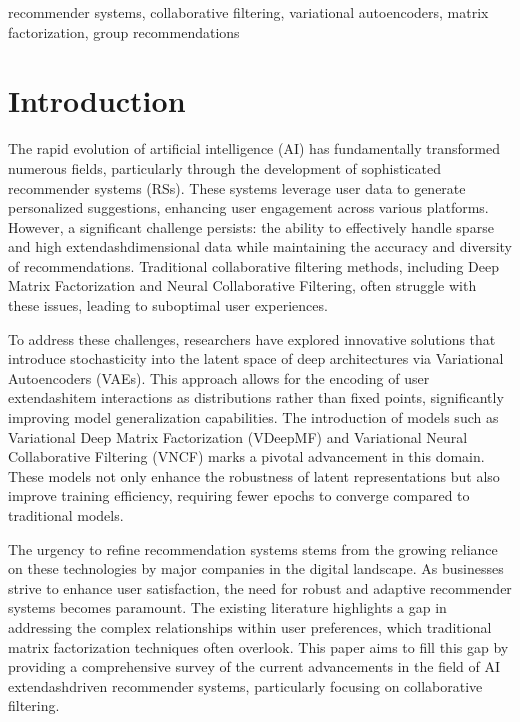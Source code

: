 \documentclass[runningheads]{llncs}
\begin{document}
\begin{keywords}
recommender systems, collaborative filtering, variational autoencoders, matrix factorization, group recommendations
\end{keywords}

\section{Introduction}
The rapid evolution of artificial intelligence (AI) has fundamentally transformed numerous fields, particularly through the development of sophisticated recommender systems (RSs). These systems leverage user data to generate personalized suggestions, enhancing user engagement across various platforms. However, a significant challenge persists: the ability to effectively handle sparse and high	extendash{}dimensional data while maintaining the accuracy and diversity of recommendations. Traditional collaborative filtering methods, including Deep Matrix Factorization and Neural Collaborative Filtering, often struggle with these issues, leading to suboptimal user experiences.

To address these challenges, researchers have explored innovative solutions that introduce stochasticity into the latent space of deep architectures via Variational Autoencoders (VAEs). This approach allows for the encoding of user	extendash{}item interactions as distributions rather than fixed points, significantly improving model generalization capabilities. The introduction of models such as Variational Deep Matrix Factorization (VDeepMF) and Variational Neural Collaborative Filtering (VNCF) marks a pivotal advancement in this domain. These models not only enhance the robustness of latent representations but also improve training efficiency, requiring fewer epochs to converge compared to traditional models.

The urgency to refine recommendation systems stems from the growing reliance on these technologies by major companies in the digital landscape. As businesses strive to enhance user satisfaction, the need for robust and adaptive recommender systems becomes paramount. The existing literature highlights a gap in addressing the complex relationships within user preferences, which traditional matrix factorization techniques often overlook. This paper aims to fill this gap by providing a comprehensive survey of the current advancements in the field of AI	extendash{}driven recommender systems, particularly focusing on collaborative filtering.
\end{document}
